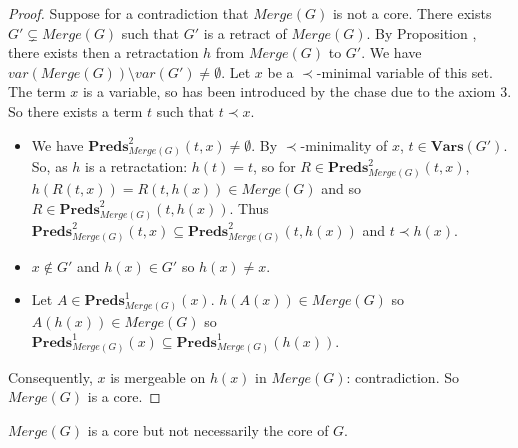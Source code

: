 \documentclass{article}
\theoremstyle{definition}
\theoremstyle{remark}
\newcommand{\Vars}{\textbf{Vars}}
\newcommand{\Preds}{\textbf{Preds}}
\newcommand{\Merge}{\textit{Merge}}
\begin{document}
\begin{proof}
Suppose for a contradiction that $\Merge(G)$ is not a core. There exists $G' \subsetneq \Merge(G)$ such that $G'$ is a retract of $\Merge(G)$. By Proposition \cite{retract}, there exists then a retractation $h$ from $\Merge(G)$ to $G'$. We have $var(\Merge(G))\setminus var(G') \neq \emptyset$. Let $x$ be a $\prec$-minimal variable of this set. The term $x$ is a variable, so has been introduced by the chase due to the axiom 3. So there exists a term $t$ such that $t \prec x$. 
\begin{itemize}
\item We have $\Preds^2_{\Merge(G)}(t,x) \neq \emptyset$. By $\prec$-minimality of $x$, $t \in \Vars(G')$. So, as $h$ is a retractation: $h(t) = t$, so for $R \in \Preds^2_{\Merge(G)}(t,x)$, $h(R(t,x)) = R(t,h(x)) \in \Merge(G)$ and so $R \in \Preds^2_{\Merge(G)}(t,h(x))$. Thus $\Preds^2_{\Merge(G)}(t,x) \subseteq \Preds^2_{\Merge(G)}(t,h(x))$ and $t \prec h(x)$.
\item $x \notin G'$ and $h(x) \in G'$ so $h(x) \neq x$. 
\item Let $A \in \Preds^1_{\Merge(G)}(x)$. $h(A(x)) \in \Merge(G)$ so $A(h(x)) \in \Merge(G)$ so $\Preds^1_{\Merge(G)}(x) \subseteq \Preds^1_{\Merge(G)}(h(x))$. 
\end{itemize}
Consequently, $x$ is mergeable on $h(x)$ in $\Merge(G)$: contradiction. So $\Merge(G)$ is a core.
\end{proof}	

$\Merge(G)$ is a core but not necessarily the core of $G$.
\end{document}
